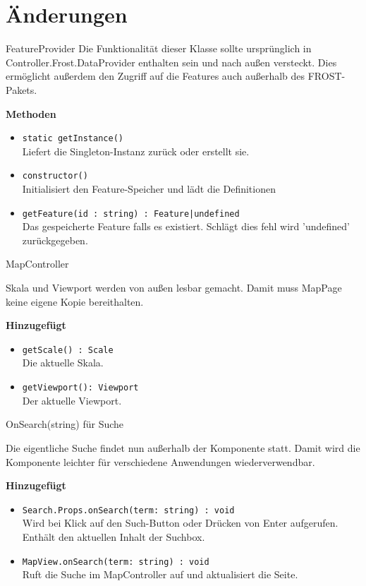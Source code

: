 \section{Änderungen}
\begin{Change}{FeatureProvider}
    Die Funktionalität dieser Klasse sollte ursprünglich in 
    Controller.Frost.DataProvider enthalten sein und nach außen versteckt.
    Dies ermöglicht außerdem den 
    Zugriff auf die Features auch außerhalb des FROST-Pakets.
    
    \bigskip
    \textbf{Methoden}
    \begin{itemize}
        \item \texttt{static getInstance()}
        \\ Liefert die Singleton-Instanz zurück oder erstellt sie.
        \item \texttt{constructor()}
        \\ Initialisiert den Feature-Speicher und lädt die Definitionen
        \item \texttt{getFeature(id : string) : Feature|undefined}
        \\ Das gespeicherte Feature falls es existiert.
        Schlägt dies fehl wird 'undefined' zurückgegeben.
    \end{itemize}
\end{Change}

\begin{Change}{MapController}
    
    Skala und Viewport werden von außen lesbar gemacht.
    Damit muss MapPage keine eigene Kopie bereithalten.

    \bigskip
    \textbf{Hinzugefügt}
    \begin{itemize}
        \item \texttt{getScale() : Scale}
        \\ Die aktuelle Skala.
        \item \texttt{getViewport(): Viewport}
        \\ Der aktuelle Viewport.
    \end{itemize}

\end{Change}

\begin{Change}{OnSearch(string) für Suche}
    
    Die eigentliche Suche findet nun außerhalb der Komponente statt.
    Damit wird die Komponente leichter für verschiedene Anwendungen wiederverwendbar.

    \bigskip
    \textbf{Hinzugefügt}
    \begin{itemize}
        \item \texttt{Search.Props.onSearch(term: string) : void}
        \\ Wird bei Klick auf den Such-Button oder Drücken von Enter aufgerufen.
        Enthält den aktuellen Inhalt der Suchbox. 
        \item \texttt{MapView.onSearch(term: string) : void}
        \\ Ruft die Suche im MapController auf und aktualisiert die Seite.
    \end{itemize}

\end{Change}

